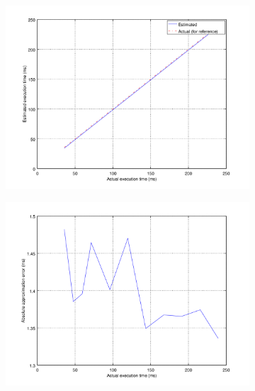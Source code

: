 \begin{figure}[ht!]
	\center
	\begin{subfigure}{0.6\linewidth}
	\center
	\includegraphics[width=\linewidth]{fig/hightaest.png}
	\end{subfigure}
	\begin{subfigure}{0.45\linewidth}
	\center
	\includegraphics[width=\linewidth]{fig/highabstaerr.png}
	\end{subfigure}
	\begin{subfigure}{0.45\linewidth}
	\center

\end{subfigure}
\end{figure}
